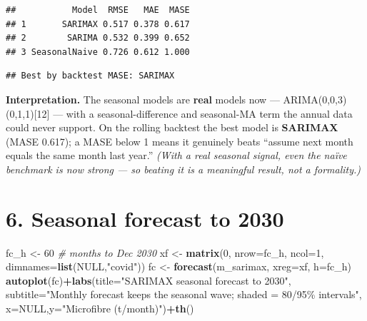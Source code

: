 \documentclass[
]{article}
\newenvironment{Shaded}{\begin{snugshade}}{\end{snugshade}}
\newcommand{\AttributeTok}[1]{\textcolor[rgb]{0.13,0.29,0.53}{#1}}
\newcommand{\CommentTok}[1]{\textcolor[rgb]{0.56,0.35,0.01}{\textit{#1}}}
\newcommand{\ConstantTok}[1]{\textcolor[rgb]{0.56,0.35,0.01}{#1}}
\newcommand{\DecValTok}[1]{\textcolor[rgb]{0.00,0.00,0.81}{#1}}
\newcommand{\FunctionTok}[1]{\textcolor[rgb]{0.13,0.29,0.53}{\textbf{#1}}}
\newcommand{\NormalTok}[1]{#1}
\newcommand{\OtherTok}[1]{\textcolor[rgb]{0.56,0.35,0.01}{#1}}
\newcommand{\SpecialCharTok}[1]{\textcolor[rgb]{0.81,0.36,0.00}{\textbf{#1}}}
\newcommand{\StringTok}[1]{\textcolor[rgb]{0.31,0.60,0.02}{#1}}
\begin{document}
\begin{verbatim}
##           Model  RMSE   MAE  MASE
## 1       SARIMAX 0.517 0.378 0.617
## 2        SARIMA 0.532 0.399 0.652
## 3 SeasonalNaive 0.726 0.612 1.000
\end{verbatim}

\begin{Shaded}
\end{Shaded}

\begin{verbatim}
## Best by backtest MASE: SARIMAX
\end{verbatim}

\textbf{Interpretation.} The seasonal models are \textbf{real} models
now --- ARIMA(0,0,3)(0,1,1){[}12{]} --- with a seasonal-difference and
seasonal-MA term the annual data could never support. On the rolling
backtest the best model is \textbf{SARIMAX} (MASE 0.617); a MASE below 1
means it genuinely beats ``assume next month equals the same month last
year.'' \emph{(With a real seasonal signal, even the naïve benchmark is
now strong --- so beating it is a meaningful result, not a formality.)}

\section{6. Seasonal forecast to 2030}\label{seasonal-forecast-to-2030}

\begin{Shaded}
\begin{Highlighting}[]
\NormalTok{fc\_h }\OtherTok{\textless{}{-}} \DecValTok{60}  \CommentTok{\# months to Dec 2030}
\NormalTok{xf }\OtherTok{\textless{}{-}} \FunctionTok{matrix}\NormalTok{(}\DecValTok{0}\NormalTok{, }\AttributeTok{nrow=}\NormalTok{fc\_h, }\AttributeTok{ncol=}\DecValTok{1}\NormalTok{, }\AttributeTok{dimnames=}\FunctionTok{list}\NormalTok{(}\ConstantTok{NULL}\NormalTok{,}\StringTok{"covid"}\NormalTok{))}
\NormalTok{fc }\OtherTok{\textless{}{-}} \FunctionTok{forecast}\NormalTok{(m\_sarimax, }\AttributeTok{xreg=}\NormalTok{xf, }\AttributeTok{h=}\NormalTok{fc\_h)}
\FunctionTok{autoplot}\NormalTok{(fc)}\SpecialCharTok{+}\FunctionTok{labs}\NormalTok{(}\AttributeTok{title=}\StringTok{"SARIMAX seasonal forecast to 2030"}\NormalTok{,}
   \AttributeTok{subtitle=}\StringTok{"Monthly forecast keeps the seasonal wave; shaded = 80/95\% intervals"}\NormalTok{,}
   \AttributeTok{x=}\ConstantTok{NULL}\NormalTok{,}\AttributeTok{y=}\StringTok{"Microfibre (t/month)"}\NormalTok{)}\SpecialCharTok{+}\FunctionTok{th}\NormalTok{()}
\end{Highlighting}
\end{Shaded}
\end{document}
